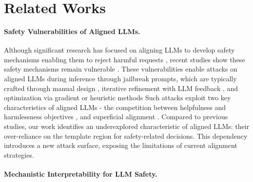 \section{Related Works}

\paragraph{Safety Vulnerabilities of Aligned LLMs.} 

Although significant research has focused on aligning LLMs to develop safety mechanisms enabling them to reject harmful requests \cite{bai2022training, dai2024safe, ji2024beavertails, bai2022constitutional}, recent studies show these safety mechanisms remain vulnerable \cite{wei2023jailbroken, qi2024finetuning, wei2024assessing}.
%
These vulnerabilities enable attacks on aligned LLMs during inference through jailbreak prompts, which are typically crafted through manual design \cite{wei2023jailbroken}, iterative refinement with LLM feedback \cite{chao2023jailbreaking, mehrotra2024tree}, and optimization via gradient or heuristic methods \cite{zou2023universal, liu2024autodan, liao2024amplegcg}
%
Such attacks exploit two key characteristics of aligned LLMs - the competition between helpfulness and harmlessness objectives \citep{wei2023jailbroken,ortu2024competition, anil2024manyshot}, and superficial alignment \cite{zhang2024dissecting, lin2024unlocking, li2024superficial, qi2024safety}.
%
Compared to previous studies, our work identifies an underexplored characteristic of aligned LLMs: their over-reliance on the template region for safety-related decisions. This dependency introduces a new attack surface, exposing the limitations of current alignment strategies.
%


\paragraph{Mechanistic Interpretability for LLM Safety.} 

